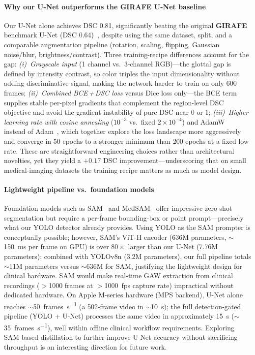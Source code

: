 \documentclass[preprint,12pt]{elsarticle}
\newcommand{\girafe}{\textbf{GIRAFE}}
\newcommand{\gaw}{GAW}
\begin{document}
\paragraph{Why our U-Net outperforms the \girafe{} U-Net baseline}
Our U-Net alone achieves DSC \num{0.81}, significantly beating the
original \girafe{} benchmark U-Net (DSC \num{0.64})~\cite{andrade2025datainbrief}, despite using the
same dataset, split, and a comparable augmentation pipeline (rotation,
scaling, flipping, Gaussian noise/blur, brightness/contrast).
Three training-recipe differences account for the gap:
\emph{(i)~Grayscale input} (1 channel vs.\ 3-channel RGB)---the glottal gap
is defined by intensity contrast, so color triples the input dimensionality
without adding discriminative signal, making the network harder to train on
only \num{600} frames;
\emph{(ii)~Combined BCE\,+\,DSC loss} versus Dice loss only---the BCE term
supplies stable per-pixel gradients that complement the region-level DSC
objective and avoid the gradient instability of pure DSC near $0$ or $1$;
\emph{(iii)~Higher learning rate with cosine annealing}
($10^{-3}$ vs.\ fixed $2{\times}10^{-4}$) and
AdamW~\cite{loshchilov2019adamw} instead of Adam~\cite{kingma2015adam},
which together explore the loss landscape more aggressively and converge in
\num{50} epochs to a stronger minimum than \num{200} epochs at a fixed low
rate.
These are straightforward engineering choices rather than architectural
novelties, yet they yield a $+0.17$ DSC improvement---underscoring that on
small medical-imaging datasets the training recipe matters as much as model
design.

\paragraph{Lightweight pipeline vs.\ foundation models}
Foundation models such as SAM~\cite{kirillov2023sam} and
MedSAM~\cite{ma2024medsam} offer impressive zero-shot segmentation but
require a per-frame bounding-box or point prompt---precisely what our YOLO
detector already provides.
Using YOLO as the SAM prompter is conceptually possible; however, SAM's
ViT-H encoder (\num{636}M parameters, ${\sim}$\SI{150}{ms} per frame on
GPU) is over $80\times$ larger than our U-Net (\num{7.76}M parameters);
combined with YOLOv8n (\num{3.2}M parameters), our full pipeline totals
${\sim}$\num{11}M parameters versus ${\sim}$\num{636}M for SAM, justifying
the lightweight design for clinical hardware.
SAM would make real-time \gaw{} extraction from clinical recordings
($>$\num{1000} frames at $>$\SI{1000}{fps} capture rate) impractical
without dedicated hardware.
On Apple M-series hardware (MPS backend), U-Net alone reaches
${\sim}$\SI{50}{frames\per\second} (a \num{502}-frame video in
${\sim}$\SI{10}{s}); the full detection-gated pipeline (YOLO + U-Net)
processes the same video in approximately \SI{15}{s}
(${\sim}$\SI{35}{frames\per\second}), well within offline clinical workflow
requirements.
Exploring SAM-based distillation to further improve U-Net accuracy without
sacrificing throughput is an interesting direction for future work.
\end{document}
